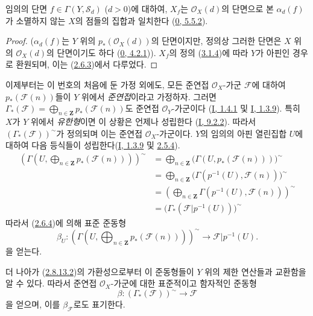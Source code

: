 \begin{proposition}[3.3.3]
\label{II.3.3.3-ko}
임의의 단면 $f\in\Gamma(Y,\mathcal{S}_d)$ ($d>0$)에 대하여, $X_f$는
$\mathcal{O}_X(d)$의 단면으로 본 $\alpha_d(f)$가 소멸하지 않는 $X$의
점들의 집합과 일치한다
(\hyperref[0.5.5.2-ko]{0, 5.5.2}).
\end{proposition}

\begin{proof}
($\alpha_d(f)$는 $Y$ 위의 $p_*(\mathcal{O}_X(d))$의 단면이지만, 정의상
그러한 단면은 $X$ 위의 $\mathcal{O}_X(d)$의 단면이기도 하다
(\hyperref[0.4.2.1-ko]{0, 4.2.1})). $X_f$의 정의
(\hyperref[II.3.1.4-ko]{3.1.4})에 따라 $Y$가 아핀인 경우로 환원되며,
이는 (\hyperref[II.2.6.3-ko]{2.6.3})에서 다루었다.
\end{proof}

\begin{env}[3.3.4]
\label{II.3.3.4-ko}
이제부터는 이 번호의 처음에 둔 가정 외에도, 모든 준연접
$\mathcal{O}_X$-가군 $\mathcal{F}$에 대하여 $p_*(\mathcal{F}(n))$들이
$Y$ 위에서 \emph{준연접}이라고 가정하자. 그러면
$\Gamma_*(\mathcal{F})=\bigoplus_{n\in\mathbf{Z}}p_*(\mathcal{F}(n))$도
준연접 $\mathcal{O}_Y$-가군이다
(\hyperref[I.1.4.1-ko]{I, 1.4.1} 및
\hyperref[I.1.3.9-ko]{I, 1.3.9}). 특히 $X$가 $Y$ 위에서
\emph{유한형}이면 이 상황은 언제나 성립한다
(\hyperref[I.9.2.2-ko]{I, 9.2.2}). 따라서
$(\Gamma_*(\mathcal{F}))^{\sim}$가 정의되며 이는 준연접
$\mathcal{O}_X$-가군이다. $Y$의 임의의 아핀 열린집합 $U$에 대하여
다음 등식들이 성립한다(\hyperref[I.1.3.9-ko]{I, 1.3.9} 및
\hyperref[II.2.5.4-ko]{2.5.4}).
\begin{align*}
  \left(\Gamma\left(U,\bigoplus_{n\in\mathbf{Z}}
  p_*(\mathcal{F}(n))\right)\right)^{\sim}
  &=\bigoplus_{n\in\mathbf{Z}}
  \bigl(\Gamma(U,p_*(\mathcal{F}(n)))\bigr)^{\sim}\\
  &=\bigoplus_{n\in\mathbf{Z}}
  \bigl(\Gamma(p^{-1}(U),\mathcal{F}(n))\bigr)^{\sim}\\
  &=\left(\bigoplus_{n\in\mathbf{Z}}
  \Gamma(p^{-1}(U),\mathcal{F}(n))\right)^{\sim}\\
  &=\bigl(\Gamma_*(\mathcal{F}|p^{-1}(U))\bigr)^{\sim}
\end{align*}
따라서 (\hyperref[II.2.6.4-ko]{2.6.4})에 의해 표준 준동형
\[
  \beta_U:\left(\Gamma\left(U,\bigoplus_{n\in\mathbf{Z}}
  p_*(\mathcal{F}(n))\right)\right)^{\sim}
  \longrightarrow\mathcal{F}|p^{-1}(U).
\]
을 얻는다.

더 나아가 (\hyperref[II.2.8.13.2-ko]{2.8.13.2})의 가환성으로부터 이
준동형들이 $Y$ 위의 제한 연산들과 교환함을 알 수 있다. 따라서 준연접
$\mathcal{O}_X$-가군에 대한 표준적이고 함자적인 준동형
\[
\label{II.3.3.4.1-ko}
  \beta:(\Gamma_*(\mathcal{F}))^{\sim}\longrightarrow\mathcal{F}
\tag{3.3.4.1}
\]
을 얻으며, 이를 $\beta_{\mathcal{F}}$로도 표기한다.
\end{env}

